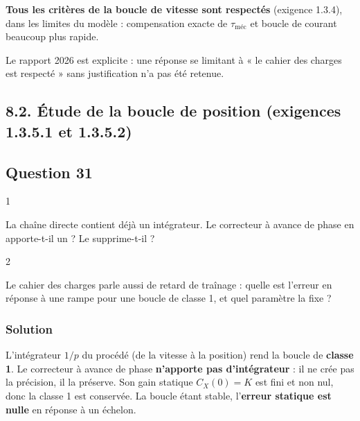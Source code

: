 \documentclass[11pt,a4paper]{article}
\begin{document}
\textbf{Tous les critères de la boucle de vitesse sont respectés} (exigence 1.3.4), dans les limites du modèle : compensation exacte de \(\tau_{\text{méc}}\) et boucle de courant beaucoup plus rapide.

\begin{jury}

Le rapport 2026 est explicite : une réponse se limitant à « le cahier des charges est respecté » sans justification n'a pas été retenue.

\end{jury}

\hypertarget{uxe9tude-de-la-boucle-de-position-exigences-1.3.5.1-et-1.3.5.2}{%
\subsection{8.2. Étude de la boucle de position (exigences 1.3.5.1 et 1.3.5.2)}\label{uxe9tude-de-la-boucle-de-position-exigences-1.3.5.1-et-1.3.5.2}}

\hypertarget{question-31}{%
\subsection{Question 31}\label{question-31}}

\begin{indication}{1}

La chaîne directe contient déjà un intégrateur. Le correcteur à avance de phase en apporte-t-il un ? Le supprime-t-il ?

\end{indication}

\begin{indication}{2}

Le cahier des charges parle aussi de retard de traînage : quelle est l'erreur en réponse à une rampe pour une boucle de classe 1, et quel paramètre la fixe ?

\end{indication}

\hypertarget{solution-30}{%
\subsubsection{Solution}\label{solution-30}}

L'intégrateur \(1/p\) du procédé (de la vitesse à la position) rend la boucle de \textbf{classe 1}. Le correcteur à avance de phase \textbf{n'apporte pas d'intégrateur} : il ne crée pas la précision, il la préserve. Son gain statique \(C_X(0) = K\) est fini et non nul, donc la classe 1 est conservée. La boucle étant stable, l'\textbf{erreur statique est nulle} en réponse à un échelon.
\end{document}
